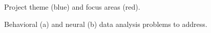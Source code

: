 \begin{figure}
    \begin{center}
        \resizebox{4.0in}{!}{%
            
        }
    \end{center}
    \caption{Project theme (blue) and focus areas (red).}
    \label{fig:focusAreas}
\end{figure}

\begin{figure}
    \centering
    \subfloat[]{
        \resizebox{3.0in}{!}{%
            
        }
    }
    \hfill
    \subfloat[]{
        \resizebox{2.25in}{!}{%
            
        }
    }
    \caption{Behavioral (a) and neural (b) data analysis problems to address.}
    \label{fig:dataAnalysis}
\end{figure}

